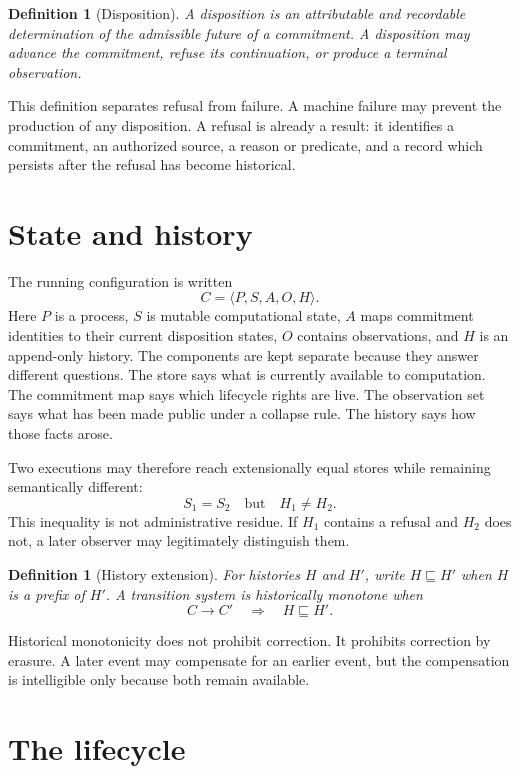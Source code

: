 \documentclass[11pt,openany]{book}
\newtheorem{definition}[theorem]{Definition}
\theoremstyle{remark}
\begin{document}
\begin{definition}[Disposition]
A \emph{disposition} is an attributable and recordable determination of
the admissible future of a commitment. A disposition may advance the
commitment, refuse its continuation, or produce a terminal observation.
\end{definition}

This definition separates refusal from failure. A machine failure may
prevent the production of any disposition. A refusal is already a result:
it identifies a commitment, an authorized source, a reason or predicate,
and a record which persists after the refusal has become historical.

\section{State and history}

The running configuration is written
\[
  C=\langle P,S,A,O,H\rangle .
\]
Here $P$ is a process, $S$ is mutable computational state, $A$ maps
commitment identities to their current disposition states, $O$ contains
observations, and $H$ is an append-only history. The components are kept
separate because they answer different questions. The store says what is
currently available to computation. The commitment map says which
lifecycle rights are live. The observation set says what has been made
public under a collapse rule. The history says how those facts arose.

Two executions may therefore reach extensionally equal stores while
remaining semantically different:
\[
  S_1=S_2 \quad\text{but}\quad H_1\ne H_2.
\]
This inequality is not administrative residue. If $H_1$ contains a refusal
and $H_2$ does not, a later observer may legitimately distinguish them.

\begin{definition}[History extension]
For histories $H$ and $H'$, write $H\sqsubseteq H'$ when $H$ is a prefix of
$H'$. A transition system is \emph{historically monotone} when
\[
  C\longrightarrow C' \quad\Longrightarrow\quad H\sqsubseteq H'.
\]
\end{definition}

Historical monotonicity does not prohibit correction. It prohibits
correction by erasure. A later event may compensate for an earlier event,
but the compensation is intelligible only because both remain available.

\section{The lifecycle}
\end{document}
